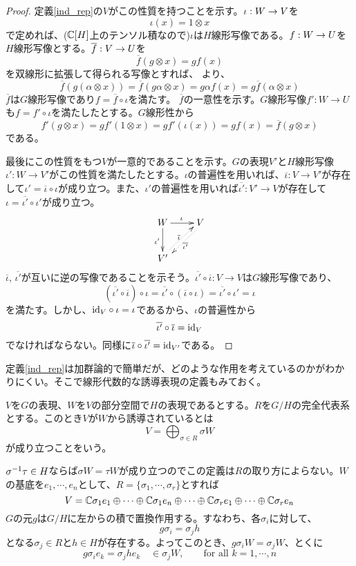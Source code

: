 \documentclass{ltjsarticle}
\begin{document}
\begin{proof}
  定義\ref{ind_rep}の$V$がこの性質を持つことを示す。$\iota:W\rightarrow V$を
  \[
  \iota(x)=1\otimes x  
  \]
  で定めれば、($\mathbb{C}[H]$上のテンソル積なので)$\iota$は$H$線形写像である。$f:W\rightarrow U$を$H$線形写像とする。$\overline{f}:V\rightarrow U$を
  \[
  \overline{f}(g\otimes x)=gf(x)
  \]
  を双線形に拡張して得られる写像とすれば、
  より、
  \[
  \overline{f}(g(\alpha\otimes x))=\overline{f}(g\alpha\otimes x)=g\alpha f(x)  =g\overline{f}(\alpha\otimes x)
  \]
  $\overline{f}$は$G$線形写像であり$f=\overline{f}\circ \iota$を満たす。 $\overline{f}$の一意性を示す。$G$線形写像$f':W\rightarrow U$も$f=f'\circ \iota$を満たしたとする。$G$線形性から
  \[
  f'(g\otimes x)=gf'(1\otimes x)=gf'(\iota(x))=gf(x)=\overline{f}(g\otimes x)  
  \]
  である。

  最後にこの性質をもつ$V$が一意的であることを示す。$G$の表現$V'$と$H$線形写像$\iota':W\rightarrow V'$がこの性質を満たしたとする。$\iota$の普遍性を用いれば、$\overline{\iota}:V\rightarrow V'$が存在して$\iota'=\overline{\iota}\circ\iota$が成り立つ。また、$\iota'$の普遍性を用いれば$\overline{\iota'}:V'\rightarrow V$が存在して$\iota=\overline{\iota'}\circ \iota'$が成り立つ。
\[
\xymatrix{
  W \ar[r]^{\iota} \ar[d]_{\iota'}& 
  V \ar@<0.5ex>@{.>}[ld]_{\overline{\iota}} \\
  V' \ar@<0.5ex>@{.>}[ru]_{\overline{\iota'}}
  }
\]
  $\overline{\iota}$, $\overline{\iota'}$が互いに逆の写像であることを示そう。$\overline{\iota'}\circ\overline{\iota}:V\rightarrow V$は$G$線形写像であり、
  \[
  (\overline{\iota'}\circ\overline{\iota})\circ\iota=
  \overline{\iota'}\circ(\overline{\iota}\circ\iota)=
  \overline{\iota'}\circ \iota'=\iota
  \]
  を満たす。しかし、$\text{id}_{V}\circ \iota=\iota$であるから、$\iota$の普遍性から
  \[
  \overline{\iota'}\circ\overline{\iota}=\text{id}_{V}
  \]
  でなければならない。同様に$\overline{\iota}\circ\overline{\iota'}=\text{id}_{V'}$である。
\end{proof}

定義\ref{ind_rep}は加群論的で簡単だが、どのような作用を考えているのかがわかりにくい。そこで線形代数的な誘導表現の定義もみておく。

\begin{defin}\label{ind_rep_2}
  $V$を$G$の表現、$W$を$V$の部分空間で$H$の表現であるとする。$R$を$G/H$の完全代表系とする。このとき$V$が$W$から誘導されているとは
  \[
  V=\bigoplus_{\sigma\in R}\sigma W  
  \]
  が成り立つことをいう。
\end{defin}

$\sigma^{-1}\tau\in H$ならば$\sigma W=\tau W$が成り立つのでこの定義は$R$の取り方によらない。$W$の基底を$e_1,\cdots,e_n$として、$R=\{\sigma_1,\cdots,\sigma_r\}$とすれば
\[
V=
\mathbb{C}\sigma_1 e_1\oplus\cdots\oplus\mathbb{C}\sigma_1 e_n
\oplus\cdots\oplus
\mathbb{C}\sigma_r e_1\oplus\cdots\oplus\mathbb{C}\sigma_r e_n
\]
$G$の元$g$は$G/H$に左からの積で置換作用する。すなわち、各$\sigma_i$に対して、
\[
g\sigma_i=\sigma_j h  
\]
となる$\sigma_j\in R$と$h\in H$が存在する。よってこのとき、$g\sigma_iW=\sigma_jW$、とくに
\begin{equation}\label{ind_action}
  g\sigma_ie_k=\sigma_j he_k  \quad\in\sigma_jW,\qquad \text{for all $k=1,\cdots,n$}  
\end{equation}
\end{document}
